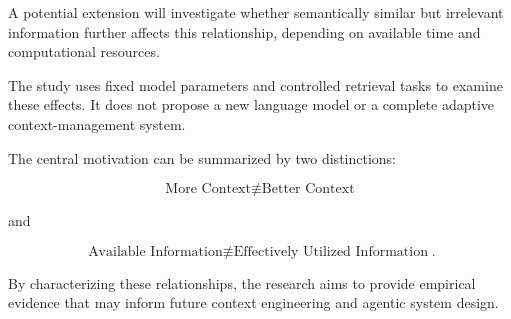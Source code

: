 A potential extension will investigate whether semantically similar but
irrelevant information further affects this relationship, depending on
available time and computational resources.

The study uses fixed model parameters and controlled retrieval tasks to examine
these effects. It does not propose a new language model or a complete adaptive
context-management system.

The central motivation can be summarized by two distinctions:

\[
    \boxed{
        \text{More Context}
        \not\equiv
        \text{Better Context}
    }
\]

and

\[
    \boxed{
        \text{Available Information}
        \not\equiv
        \text{Effectively Utilized Information}
    }.
\]

By characterizing these relationships, the research aims to provide empirical
evidence that may inform future context engineering and agentic system design.
